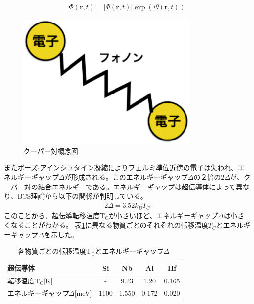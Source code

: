 \begin{eqnarray}
\Phi (\bm{r},t) = |\Phi (\bm{r},t)| \exp (i \theta (\bm{r},t))
\end{eqnarray}

\begin{figure}[htbp]
  \begin{center}
    \includegraphics[width=9.0cm]{./Chapter/Chapter2/Picture/Cooperpair.eps}
    \caption{クーパー対概念図}
    \label{fig:CooperPair}
  \end{center}
\end{figure}

またボーズ$\cdot$アインシュタイン凝縮によりフェルミ準位近傍の電子は失われ、エネルギーギャップ$\Delta$が形成される。このエネルギーギャップ$\Delta$の２倍の$2 \Delta$が、クーパー対の結合エネルギーである。エネルギーギャップは超伝導体によって異なり、BCS理論から以下の関係が判明している。
\begin{eqnarray}
2 \Delta = 3.52 k_{B} T_{C}
\label{eq:E_Tc}
\end{eqnarray}
このことから、超伝導転移温度$\mathrm{T_C}$が小さいほど、エネルギーギャップ$\Delta$は小さくなることがわかる。
表\ref{tab:TcDelta}に異なる物質ごとのそれぞれの転移温度$T_C$とエネルギーギャップ$\Delta$を示した。

\begin{table}[htb]
	\begin{center}
		\caption{各物質ごとの転移温度$\mathrm{T_C}$とエネルギーギャップ$\Delta$}
		\begin{tabular}{| l || c | c | c | c |} \hline
			超伝導体 & Si & Nb & Al & Hf \\ \hline \hline
			転移温度$\mathrm{T_C}$[K] & - & 9.23 & 1.20 & 0.165 \\ \hline
			エネルギーギャップ$\Delta$[meV] & 1100 & 1.550 & 0.172 & 0.020 \\ \hline
		\end{tabular}
		\label{tab:TcDelta}
	\end{center}
\end{table}

